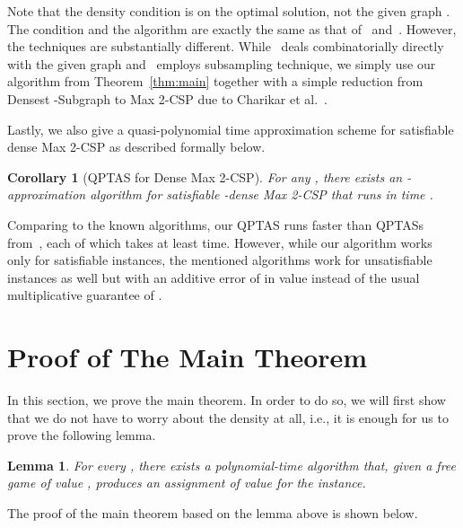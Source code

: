 \documentclass{article}
\newtheorem{lemma}{Lemma}
\newtheorem{corollary}{Corollary}
\begin{document}
Note that the density condition is on the optimal solution, not the given graph . The condition and the algorithm are exactly the same as that of~\cite{FPK01} and~\cite{ST05}. However, the techniques are substantially different. While~\cite{FPK01} deals combinatorially directly with the given graph  and~\cite{ST05} employs subsampling technique, we simply use our algorithm from Theorem~\ref{thm:main} together with a simple reduction from {\sc Densest -Subgraph} to {\sc Max 2-CSP} due to Charikar et al.~\cite{CHK}.

Lastly, we also give a quasi-polynomial time approximation scheme for satisfiable dense {\sc Max 2-CSP} as described formally below. \\

\begin{corollary}[QPTAS for Dense {Max 2-CSP}] \label{cor:qptas-dense}
  For any , there exists an -approximation algorithm for satisfiable -dense {\sc Max 2-CSP} that runs in time .
\end{corollary}

Comparing to the known algorithms, our QPTAS runs faster than QPTASs from~\cite{Alon:2003:RSA:963875.963877, AKK95, BMHS11}, each of which takes at least  time. However, while our algorithm works only for satisfiable instances, the mentioned algorithms work for unsatisfiable instances as well but with an additive error of  in value instead of the usual multiplicative guarantee of .

\section{Proof of The Main Theorem}

In this section, we prove the main theorem. In order to do so, we will first show that we do not have to worry about the density  at all, i.e., it is enough for us to prove the following lemma. \\

\begin{lemma} \label{lem:main}
  For every , there exists a polynomial-time algorithm that, given a free game  of value , produces an assignment of value  for the instance.
\end{lemma}

The proof of the main theorem based on the lemma above is shown below.
\end{document}
